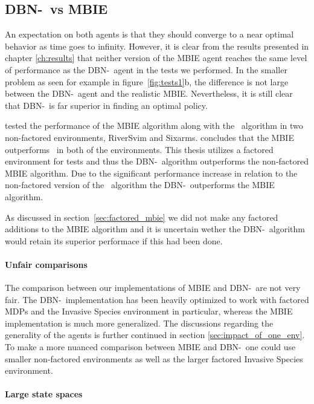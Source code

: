 \subsection{DBN-\etre\ vs MBIE}
\label{sec:dbn_vs_mbie}

An expectation on both agents is that they should converge to a near optimal
behavior as time goes to infinity. However, it is clear from the results
presented in chapter \ref{ch:results} that neither version of the MBIE agent
reaches the same level of performance as the DBN-\etre\ agent in the tests we
performed. In the smaller problem as seen for example in
figure~\ref{fig:tests1}b, the difference is not large between the DBN-\etre\ agent
and the realistic MBIE. Nevertheless, it is still clear that DBN-\etre\ is far
superior in finding an optimal policy.

\textcite{strehl2004empirical} tested the performance of the MBIE algorithm
along with the \etre\ algorithm in two non-factored environments, RiverSvim and
Sixarms. \textcite{strehl2004empirical} concludes that the MBIE outperforms
\etre\ in both of the environments. This thesis utilizes a factored environment
for tests and thus the DBN-\etre\ algorithm outperforms the non-factored MBIE
algorithm. Due to the significant performance increase in relation to the
non-factored version of the \etre\ algorithm the DBN-\etre\ outperforms the
MBIE algorithm.

As discussed in section~\ref{sec:factored_mbie} we did not make any factored
additions to the MBIE algorithm and it is uncertain wether the DBN-\etre\
algorithm would retain its superior performace if this had been done.

\paragraph{Unfair comparisons}

The comparison between our implementations of MBIE and DBN-\etre\ are not very
fair. The DBN-\etre\ implementation has been heavily optimized to work with
factored MDPs and the Invasive Species environment in particular, whereas the
MBIE implementation is much more generalized. The discussions regarding the
generality of the agents is further continued in section
\ref{sec:impact_of_one_env}. To make a more nuanced comparison between MBIE and
DBN-\etre\ one could use smaller non-factored environments as well as the
larger factored Invasive Species environment.


\paragraph{Large state spaces}

